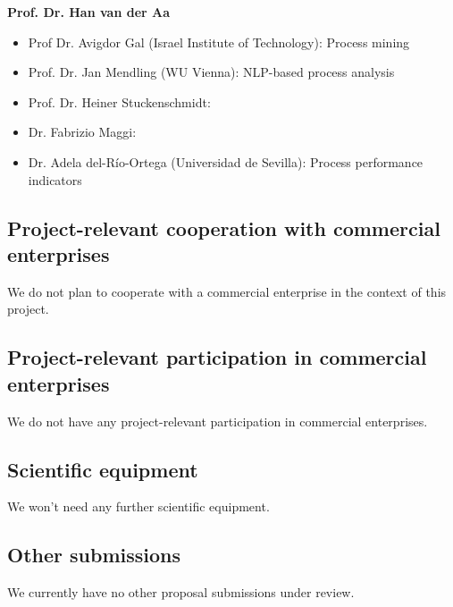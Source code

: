 \textbf{Prof. Dr. Han van der Aa}

\begin{itemize}
\item Prof Dr. Avigdor Gal (Israel Institute of Technology): Process mining
\item Prof. Dr. Jan Mendling (WU Vienna): NLP-based process analysis 
\item Prof. Dr. Heiner Stuckenschmidt: 
\item Dr. Fabrizio Maggi:
\item Dr. Adela del-R\'{i}o-Ortega (Universidad de Sevilla): Process performance indicators
\end{itemize}


\subsection{Project-relevant cooperation with commercial enterprises}

We do not plan to cooperate with a commercial enterprise in the context of this project. 


\subsection{Project-relevant participation in commercial enterprises}

We do not have any project-relevant participation in commercial enterprises.  

\subsection{Scientific equipment}

We won't need any further scientific equipment. 

\subsection{Other submissions}

We currently have no other proposal submissions under review.  